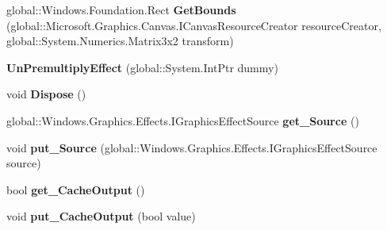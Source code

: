 \begin{DoxyCompactItemize}
global\+::\+Windows.\+Foundation.\+Rect {\bfseries Get\+Bounds} (global\+::\+Microsoft.\+Graphics.\+Canvas.\+I\+Canvas\+Resource\+Creator resource\+Creator, global\+::\+System.\+Numerics.\+Matrix3x2 transform)
\item 
\mbox{\label{class_microsoft_1_1_graphics_1_1_canvas_1_1_effects_1_1_un_premultiply_effect_afec8af676d2e6c2a8e095f427e8782f9}} 
{\bfseries Un\+Premultiply\+Effect} (global\+::\+System.\+Int\+Ptr dummy)
\item 
\mbox{\label{class_microsoft_1_1_graphics_1_1_canvas_1_1_effects_1_1_un_premultiply_effect_a046dc1273449b99a5005b41f3a9300ee}} 
void {\bfseries Dispose} ()
\item 
\mbox{\label{class_microsoft_1_1_graphics_1_1_canvas_1_1_effects_1_1_un_premultiply_effect_a8edd8d7c36e87f9f8d1187028b644c4f}} 
global\+::\+Windows.\+Graphics.\+Effects.\+I\+Graphics\+Effect\+Source {\bfseries get\+\_\+\+Source} ()
\item 
\mbox{\label{class_microsoft_1_1_graphics_1_1_canvas_1_1_effects_1_1_un_premultiply_effect_a20525045ca936b234efc32a3132f5562}} 
void {\bfseries put\+\_\+\+Source} (global\+::\+Windows.\+Graphics.\+Effects.\+I\+Graphics\+Effect\+Source source)
\item 
\mbox{\label{class_microsoft_1_1_graphics_1_1_canvas_1_1_effects_1_1_un_premultiply_effect_a256aeca5e043b39b008fe14fe263583b}} 
bool {\bfseries get\+\_\+\+Cache\+Output} ()
\item 
\mbox{\label{class_microsoft_1_1_graphics_1_1_canvas_1_1_effects_1_1_un_premultiply_effect_ac8a6cc3add216c45f334769bf96b5e90}} 
void {\bfseries put\+\_\+\+Cache\+Output} (bool value)
\item 
\mbox{\label{class_microsoft_1_1_graphics_1_1_canvas_1_1_effects_1_1_un_premultiply_effect_af611030c9f4e93976a293ee18873ae1c}} 

\end{DoxyCompactItemize}
